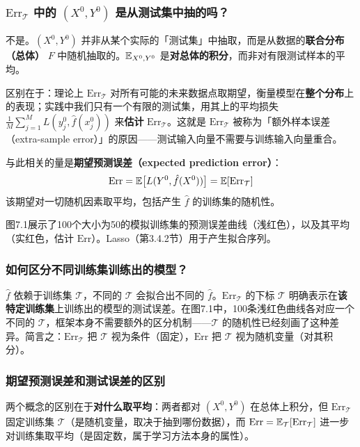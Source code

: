 \subsubsection{$\mathrm{Err}_{\mathcal{T}}$ 中的 $(X^0, Y^0)$ 是从测试集中抽的吗？}

不是。$(X^0, Y^0)$ 并非从某个实际的「测试集」中抽取，而是从数据的\textbf{联合分布（总体）} $F$ 中随机抽取的。$\mathbb{E}_{X^0, Y^0}$ 是\textbf{对总体的积分}，而非对有限测试样本的平均。

区别在于：理论上 $\mathrm{Err}_{\mathcal{T}}$ 对所有可能的未来数据点取期望，衡量模型在\textbf{整个分布}上的表现；实践中我们只有一个有限的测试集，用其上的平均损失 $\frac{1}{M}\sum_{j=1}^{M} L(y_j^0, \hat{f}(x_j^0))$ 来\textbf{估计} $\mathrm{Err}_{\mathcal{T}}$。这就是 $\mathrm{Err}_{\mathcal{T}}$ 被称为「额外样本误差（extra-sample error）」的原因——测试输入向量不需要与训练输入向量重合。

与此相关的量是\textbf{期望预测误差（expected prediction error）}：
\begin{equation}\label{eq:Err}
    \mathrm{Err} = \mathbb{E}\bigl[L(Y^0, \hat{f}(X^0))\bigr] = \mathbb{E}[\mathrm{Err}_{\mathcal{T}}]
\end{equation}
该期望对一切随机因素取平均，包括产生 $\hat{f}$ 的训练集的随机性。

图7.1展示了100个大小为50的模拟训练集的预测误差曲线（浅红色），以及其平均（实红色，估计 $\mathrm{Err}$）。Lasso（第3.4.2节）用于产生拟合序列。

\subsubsection{如何区分不同训练集训练出的模型？}

$\hat{f}$ 依赖于训练集 $\mathcal{T}$，不同的 $\mathcal{T}$ 会拟合出不同的 $\hat{f}$。$\mathrm{Err}_{\mathcal{T}}$ 的下标 $\mathcal{T}$ 明确表示在\textbf{该特定训练集}上训练出的模型的测试误差。在图7.1中，100条浅红色曲线各对应一个不同的 $\mathcal{T}$，框架本身不需要额外的区分机制——$\mathcal{T}$ 的随机性已经刻画了这种差异。简言之：$\mathrm{Err}_{\mathcal{T}}$ 把 $\mathcal{T}$ 视为条件（固定），$\mathrm{Err}$ 把 $\mathcal{T}$ 视为随机变量（对其积分）。

\subsubsection{期望预测误差和测试误差的区别}

两个概念的区别在于\textbf{对什么取平均}：两者都对 $(X^0, Y^0)$ 在总体上积分，但 $\mathrm{Err}_{\mathcal{T}}$ 固定训练集 $\mathcal{T}$（是随机变量，取决于抽到哪份数据），而 $\mathrm{Err} = \mathbb{E}_{\mathcal{T}}[\mathrm{Err}_{\mathcal{T}}]$ 进一步对训练集取平均（是固定数，属于学习方法本身的属性）。

